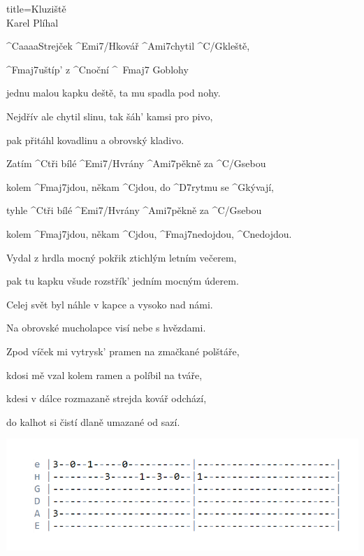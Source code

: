 \begin{song}{title=\predtitle\centering Kluziště \\\large Karel Plíhal \vspace*{-0.3cm}}  %
\begin{centerjustified}
\nejvetsi

\sloka 
	^{C{\color{white}aaaa}}Strejček ^{Emi7/H}kovář ^{Ami7}chytil ^{C/G}kleště, 

	^{Fmaj7}uštíp' z ^{C}noční ^{\,\,\,Fmaj7\,\,G}oblohy
	
	jednu malou kapku deště, ta mu spadla pod nohy.
	
	Nejdřív ale chytil slinu, tak šáh' kamsi pro pivo,
	
	pak přitáhl kovadlinu a obrovský kladivo.

	Zatím ^{C}tři bílé ^{Emi7/H}vrány ^{Ami7}pěkně za ^{C/G}sebou
	
	kolem ^{Fmaj7}jdou, někam ^{C}jdou, do ^{D7}rytmu se ^{G}kývají,

	tyhle ^{C}tři bílé ^{Emi7/H}vrány ^{Ami7}pěkně za ^{C/G}sebou
	
	kolem ^{Fmaj7}jdou, někam ^{C}jdou, ^{Fmaj7}nedojdou, ^{C}nedojdou.

	\phantom{.}



\sloka	
	Vydal z hrdla mocný pokřik ztichlým letním večerem,
	
	pak tu kapku všude rozstřík' jedním mocným úderem.
	
	Celej svět byl náhle v kapce a vysoko nad námi.
	
	Na obrovské mucholapce visí nebe s hvězdami.


\sloka
	Zpod víček mi vytrysk' pramen na zmačkané polštáře,
	
	kdosi mě vzal kolem ramen a políbil na tváře,
	
	kdesi v dálce rozmazaně strejda kovář odchází,
	
	do kalhot si čistí dlaně umazané od sazí. 


\includegraphics[scale=0.5]{../taby/kluziste.PNG}
\end{centerjustified}
\setcounter{Slokočet}{0}
\end{song}
